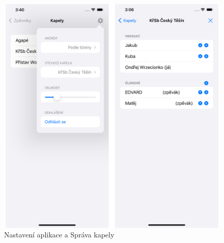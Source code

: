 
\begin{figure}
    \includegraphics[width=\textwidth]{images/C-ui/C-5-nastaveni-aplikace-sprava-kapely.png}
    \caption{Nastavení aplikace a Správa kapely}
\end{figure}
